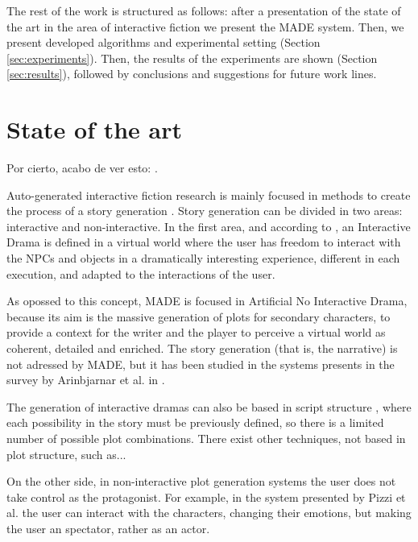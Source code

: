 \documentclass[final,1p,times]{elsarticle}
\begin{document}
The rest of the work is structured as follows: after a presentation of
the state of
the art in  the area of interactive fiction
 we present the MADE system. Then, we present developed algorithms and experimental setting (Section \ref{sec:experiments}). 
Then, the results of the experiments are shown (Section \ref{sec:results}), followed by conclusions and suggestions for future work lines.


%
\section{State of the art}
\label{sec:soa}
%
Por cierto, acabo de ver esto: \cite{StoryTecGobel2008}.

Auto-generated interactive fiction research is mainly focused in methods to create the process of a story generation \cite{nairat2011character}. Story generation can be divided in two areas: interactive and non-interactive. In the first area, and according to \cite{ReviewArinbjarnar09}, an Interactive Drama is defined in a virtual world where the user has freedom to interact with the NPCs and objects in a dramatically interesting experience, different in each execution, and adapted to the interactions of the user.

As opossed to this concept, MADE is focused in Artificial No Interactive Drama, because its aim is the massive generation of plots for secondary characters, to provide a context for the writer and the player to perceive a virtual world as coherent, detailed and enriched. The story generation (that is, the narrative) is not adressed by MADE, but it has been studied in the systems presents in the survey by Arinbjarnar et al. in \cite{ReviewArinbjarnar09}.

The generation of interactive dramas can also be based in script structure \cite{ArchitectureYoung04}, where each possibility in the story must be previously defined, so there is a limited number of possible plot combinations. There exist other techniques, not based in plot structure, such as...

On the other side, in non-interactive plot generation systems the user does not take control as the protagonist. For example, in the system presented by Pizzi et al. \cite{pizzi2007interactive} the user can interact with the characters, changing their emotions, but making the user an spectator, rather as an actor. %
\end{document}
